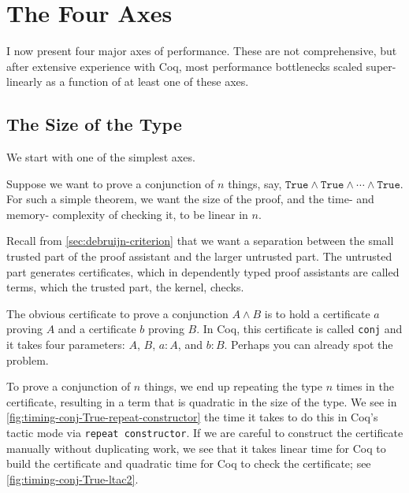 \section{The Four Axes}
I now present four major axes of performance.
These are not comprehensive, but after extensive experience with Coq, most performance bottlenecks scaled super-linearly as a function of at least one of these axes.

\subsection{The Size of the Type}

We start with one of the simplest axes.

Suppose we want to prove a conjunction of $n$ things, say, $\texttt{True} \wedge \texttt{True} \wedge \cdots \wedge \texttt{True}$.
For such a simple theorem, we want the size of the proof, and the time- and memory- complexity of checking it, to be linear in $n$.

Recall from \autoref{sec:debruijn-criterion} that we want a separation between the small trusted part of the proof assistant and the larger untrusted part.
The untrusted part generates certificates, which in dependently typed proof assistants are called terms, which the trusted part, the kernel, checks.

The obvious certificate to prove a conjunction $A \wedge B$ is to hold a certificate $a$ proving $A$ and a certificate $b$ proving $B$.
In Coq, this certificate is called \texttt{conj} and it takes four parameters: $A$, $B$, $a : A$, and $b : B$.
Perhaps you can already spot the problem.

To prove a conjunction of $n$ things, we end up repeating the type $n$ times in the certificate, resulting in a term that is quadratic in the size of the type.
We see in \autoref{fig:timing-conj-True-repeat-constructor} the time it takes to do this in Coq's tactic mode via \texttt{repeat constructor}.
If we are careful to construct the certificate manually without duplicating work, we see that it takes linear time for Coq to build the certificate and quadratic time for Coq to check the certificate; see \autoref{fig:timing-conj-True-ltac2}.

